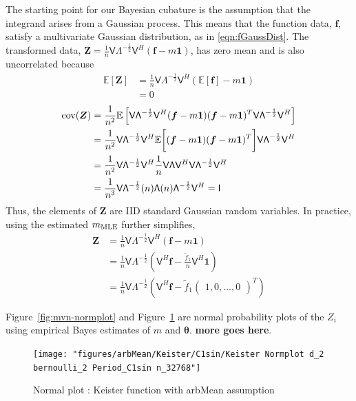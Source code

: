 \documentclass{iitthesis}          %
\newcommand{\bm}[1]{\boldsymbol{#1}}
\newcommand{\Ex}{\mathbb{E}}
\newcommand{\vtheta}{{\bm{\theta}}}
\newcommand{\vf}{\bm{f}}
\newcommand{\vZ}{\bm{Z}}
\newcommand{\vone}{\bm{1}}
\newcommand{\cov}{{\textup{cov}}}
\newcommand{\mLambda}{\mathsf{\Lambda}}
\newcommand{\mV}{\mathsf{V}}
\newcommand{\MLE}{\textup{MLE}}
\newcommand\figref{Figure~\ref}
\begin{document}
{{{{{{The starting point for our Bayesian cubature is the assumption that the integrand arises from a Gaussian process. This means that the function data, $\vf$, satisfy a multivariate Gaussian distribution, as in \eqref{eqn:fGaussDist}.  The transformed data, $\vZ = \frac 1n \mV \mLambda^{-\frac 12} \mV^H(\vf - m \vone)$, has zero mean and is also uncorrelated because
\begin{align*}
\Ex\left[\vZ \right] &= 
\frac 1n \mV \mLambda^{-\frac 12} \mV^H(\Ex\left[\vf\right] - m \vone) 
\\
& = 0
\end{align*}
\begin{align*}
\cov (\vZ) 
&= \frac {1}{n^2} \Ex\left[  
\mV \mLambda^{-\frac 12} \mV^H (\vf - m \vone)
(\vf - m \vone)^T \mV \mLambda^{-\frac 12} \mV^H
\right]
\\
&=
\frac {1}{n^2} \mV \mLambda^{-\frac 12} \mV^H 
\Ex \biggl[ (\vf - m \vone)
(\vf - m \vone)^T \biggr] \mV \mLambda^{-\frac 12} \mV^H
\\ %
&=
\frac{1}{n^2} \mV \mLambda^{-\frac 12} \mV^H 
\frac 1n \mV \mLambda \mV^H \mV \mLambda^{-\frac 12} \mV^H
\\
&=
\frac{1}{n^3} \mV \mLambda^{-\frac 12} (n) \mLambda (n) \mLambda^{-\frac 12} \mV^H
= \mathsf{I}
\end{align*}
Thus, the elements of $\vZ$ are IID standard Gaussian random variables.  
In practice, using the estimated $m_\MLE$ further simplifies, 
\begin{align*}
\vZ &= \frac 1n \mV \mLambda^{-\frac 12} \mV^H(\vf - m \vone) \\
 &= \frac 1n \mV \mLambda^{-\frac 12} (\mV^H \vf - \frac{\tilde{f}_1}{n} \mV^H \vone) 
\\
 &= \frac 1n \mV \mLambda^{-\frac 12} \left(\mV^H \vf - \tilde{f}_1 \begin{pmatrix}1, 0, \hdots, 0 \end{pmatrix}^T \right) 
\end{align*}

\figref{fig:mvn-normplot} and \figref{fig:keister-normplot} are normal probability plots of the $Z_i$ using empirical Bayes estimates of $m$ and $\vtheta$. \textbf{more goes here}.


\iffalse
\begin{figure}[ht]
	\centering
	\texttt{[image: "figures/arbMean/Keister/C1sin/Keister Normplot d\_2 bernoulli\_2 Period\_C1sin n\_32768"]}
	\caption{Normal plot : Keister function with arbMean assumption}
	\label{fig:keister-normplot}
\end{figure}

}}}}}}
\end{document}
